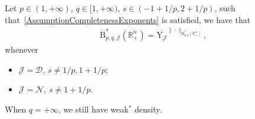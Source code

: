 \documentclass[AHL,Unicode,longabstracts,published]{cedram}
\newcommand{\bbR}{\mathbb{R}}
\newcommand{\rmB}{\mathrm{B}}
\newcommand{\rmY}{\mathrm{Y}}
\newcommand{\clN}{\mathcal{N}}
\newcommand{\clJ}{\mathcal{J}}
\newcommand{\clD}{\mathcal{D}}
\begin{document}
\begin{prop}\label{prop:DensityResultHomNeumDirBesov}
Let $p\in(1,+\infty)$, $q\in[1,+\infty)$, $s\in(-1+1/p,2+1/p)$, such that~\eqref{AssumptionCompletenessExponents} is satisfied, we have that
\begin{align*}
\dot{\rmB}^{s}_{p,q,\clJ}\left(\bbR^n_+\right) = \overline{\rmY_{\clJ}}^{\|\cdot\|_{\dot{\rmB}^{s}_{p,q}\left(\bbR^n_+\right)}},
\end{align*}
whenever
\begin{itemize}
\item $\clJ=\clD$, $s\neq 1/p,1+1/p$;
\item $\clJ=\clN$, $s\neq 1+1/p$.
\end{itemize}
When $q=+\infty$, we still have weak${}^\ast$ density.
\end{prop}
\end{document}

